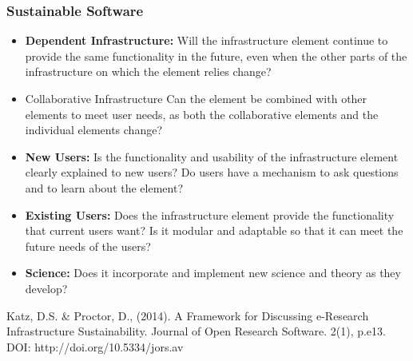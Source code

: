 \begin{frame}
\frametitle{Sustainable Software} 
\begin{itemize}
\item {\bf Dependent Infrastructure:} Will the infrastructure element continue to provide the same functionality in the future, even when the other parts of the infrastructure on which the element relies change?
\item {Collaborative Infrastructure} Can the element be combined with other elements to meet user needs, as both the collaborative elements and the individual elements change?
\item {\bf New Users:} Is the functionality and usability of the infrastructure element clearly explained to new users? Do users have a mechanism to ask questions and to learn about the element?
\item {\bf Existing Users:} Does the infrastructure element provide the functionality that current users want? Is it modular and adaptable so that it can meet the future needs of the users?
\item {\bf Science:} Does it incorporate and implement new science and theory as they develop?
\end{itemize}

\tiny{ Katz, D.S. \& Proctor, D., (2014). A Framework for Discussing e-Research Infrastructure Sustainability. Journal of Open Research Software. 2(1), p.e13. DOI: http://doi.org/10.5334/jors.av}
\end{frame}


